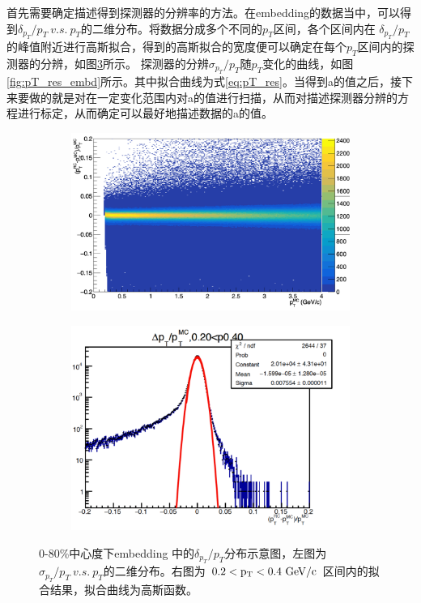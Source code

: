 首先需要确定描述得到探测器的分辨率的方法。在embedding的数据当中，可以得到$\delta_{p_T}/p_T ~v.s.~p_T$的二维分布。将数据分成多个不同的$p_T$区间，各个区间内在 $\delta_{p_T}/p_T$的峰值附近进行高斯拟合，得到的高斯拟合的宽度便可以确定在每个$p_T$区间内的探测器的分辨，如图\ref{fig:Pt_res}所示。
探测器的分辨$\sigma_{p_T}/p_T$随$p_T$变化的曲线，如图\ref{fig:pT_res_embd}所示。其中拟合曲线为式\ref{eq:pT_res}。当得到a的值之后，接下来要做的就是对在一定变化范围内对a的值进行扫描，从而对描述探测器分辨的方程进行标定，从而确定可以最好地描述数据的a的值。
\begin{figure}[htb]
    \centering
    \begin{subfigure}[b]{0.45\textwidth}
        \centering
        \includegraphics[width=\textwidth,clip]{figures/Chapter4/Pt_res_2D.png}
        \caption{}
        \label{fig:Pt_res_2D}
    \end{subfigure}
    \hfill
    \begin{subfigure}[b]{0.45\textwidth}
        \centering
        \includegraphics[width=\textwidth,clip]{figures/Chapter4/Pt_res_fit.png}
        \caption{}
        \label{fig:Pt_res_fit}
    \end{subfigure}
    \caption[0-80\%中心度下embedding 中的$\delta_{p_T}/p_T$分布示意图]{0-80\%中心度下embedding 中的$\delta_{p_T}/p_T$分布示意图，左图为$ \sigma_{p_T}/p_T~v.s.~p_T$的二维分布。右图为 $\rm{0.2 < p_T < 0.4~GeV/c}$ 区间内的拟合结果，拟合曲线为高斯函数。 }
    \label{fig:Pt_res}
\end{figure}
